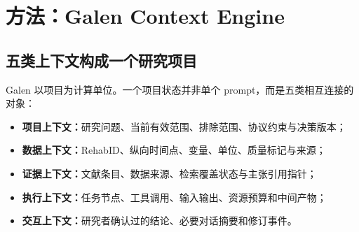 \documentclass[10pt,a4paper]{article}
\newcommand{\Key}[1]{\textbf{#1}}
\begin{document}
\section{方法：Galen Context Engine}
\subsection{五类上下文构成一个研究项目}
Galen 以项目为计算单位。一个项目状态并非单个 prompt，而是五类相互连接的对象：
\begin{itemize}[leftmargin=2.1em,itemsep=2pt]
\item \Key{项目上下文：}研究问题、当前有效范围、排除范围、协议约束与决策版本；
\item \Key{数据上下文：}RehabID、纵向时间点、变量、单位、质量标记与来源；
\item \Key{证据上下文：}文献条目、数据来源、检索覆盖状态与主张引用指针；
\item \Key{执行上下文：}任务节点、工具调用、输入输出、资源预算和中间产物；
\item \Key{交互上下文：}研究者确认过的结论、必要对话摘要和修订事件。
\end{itemize}
\end{document}
